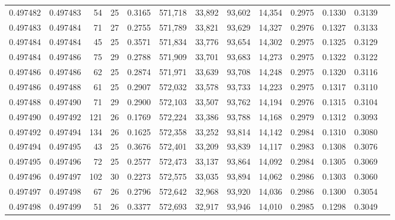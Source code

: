 \begin{tabular}{rrrrrrrrrrrrr}
0.497482 & 0.497483 &  54 &  25 &                                     0.3165 & 571,718 &  33,892 &  93,602 &  14,354 & 0.2975 & 0.1330 & 0.3139 \\
0.497483 & 0.497484 &  71 &  27 &                                     0.2755 & 571,789 &  33,821 &  93,629 &  14,327 & 0.2976 & 0.1327 & 0.3133 \\
0.497484 & 0.497484 &  45 &  25 &                                     0.3571 & 571,834 &  33,776 &  93,654 &  14,302 & 0.2975 & 0.1325 & 0.3129 \\
0.497484 & 0.497486 &  75 &  29 &                                     0.2788 & 571,909 &  33,701 &  93,683 &  14,273 & 0.2975 & 0.1322 & 0.3122 \\
0.497486 & 0.497486 &  62 &  25 &                                     0.2874 & 571,971 &  33,639 &  93,708 &  14,248 & 0.2975 & 0.1320 & 0.3116 \\
0.497486 & 0.497488 &  61 &  25 &                                     0.2907 & 572,032 &  33,578 &  93,733 &  14,223 & 0.2975 & 0.1317 & 0.3110 \\
0.497488 & 0.497490 &  71 &  29 &                                     0.2900 & 572,103 &  33,507 &  93,762 &  14,194 & 0.2976 & 0.1315 & 0.3104 \\
0.497490 & 0.497492 & 121 &  26 &                                     0.1769 & 572,224 &  33,386 &  93,788 &  14,168 & 0.2979 & 0.1312 & 0.3093 \\
0.497492 & 0.497494 & 134 &  26 &                                     0.1625 & 572,358 &  33,252 &  93,814 &  14,142 & 0.2984 & 0.1310 & 0.3080 \\
0.497494 & 0.497495 &  43 &  25 &                                     0.3676 & 572,401 &  33,209 &  93,839 &  14,117 & 0.2983 & 0.1308 & 0.3076 \\
0.497495 & 0.497496 &  72 &  25 &                                     0.2577 & 572,473 &  33,137 &  93,864 &  14,092 & 0.2984 & 0.1305 & 0.3069 \\
0.497496 & 0.497497 & 102 &  30 &                                     0.2273 & 572,575 &  33,035 &  93,894 &  14,062 & 0.2986 & 0.1303 & 0.3060 \\
0.497497 & 0.497498 &  67 &  26 &                                     0.2796 & 572,642 &  32,968 &  93,920 &  14,036 & 0.2986 & 0.1300 & 0.3054 \\
0.497498 & 0.497499 &  51 &  26 &                                     0.3377 & 572,693 &  32,917 &  93,946 &  14,010 & 0.2985 & 0.1298 & 0.3049 \\

\end{tabular}
